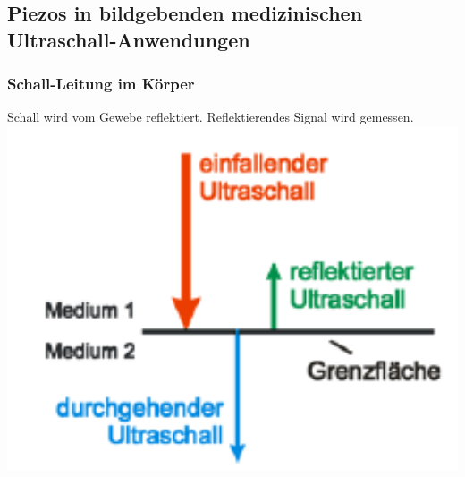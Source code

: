 \subsection{Piezos
in bildgebenden medizinischen
Ultraschall-Anwendungen}

\begin{minipage}{0.3\textwidth}
    \subsubsection{Schall-Leitung im Körper}
    Schall wird vom Gewebe reflektiert. Reflektierendes Signal wird gemessen.\\
    \includegraphics[width=1.0\textwidth]{images/SchallLeitung}\\\\
\end{minipage}
\hfill
